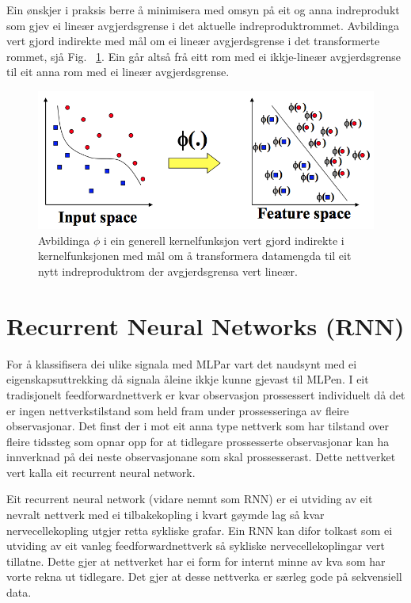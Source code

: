 \documentclass[oneside, nynorsk]{book}
\begin{document}
Ein ønskjer i praksis berre å minimisera med omsyn på eit og anna indreprodukt som gjev ei lineær avgjerdsgrense i det aktuelle indreproduktrommet. Avbildinga vert gjord indirekte med mål om ei lineær avgjerdsgrense i det transformerte rommet, sjå Fig. ~\ref{kerneltrick}.
Ein går altså frå eitt rom med ei ikkje-lineær avgjerdsgrense til eit anna rom med ei
lineær avgjerdsgrense.

\begin{figure}[h!]
    \centering
    \centerline{\includegraphics[width=1\linewidth]{kerneltrick}}
    \caption{Avbildinga $\phi$ i ein generell kernelfunksjon vert gjord indirekte i kernelfunksjonen med mål om å transformera datamengda til eit nytt indreproduktrom der avgjerdsgrensa vert lineær.}
    \label{kerneltrick}
\end{figure}
\newpage
\section{Recurrent Neural Networks (RNN)}
For å klassifisera dei ulike signala med MLPar vart det naudsynt med ei eigenskapsuttrekking då signala åleine ikkje
kunne gjevast til MLPen. I eit tradisjonelt feedforwardnettverk er kvar observasjon prossessert individuelt då det er ingen nettverkstilstand
som held fram under prossesseringa av fleire observasjonar. Det finst der i mot eit anna type nettverk som har tilstand over fleire tidssteg
som opnar opp for at tidlegare prossesserte observasjonar kan ha innverknad på dei neste observasjonane som skal prossesserast.
Dette nettverket vert kalla eit recurrent neural network.

Eit recurrent neural network (vidare nemnt som RNN) er ei utviding av eit nevralt nettverk med ei tilbakekopling i kvart gøymde lag så
kvar nervecellekopling utgjer retta sykliske grafar. Ein RNN kan difor tolkast som ei utviding av eit vanleg feedforwardnettverk så
sykliske nervecellekoplingar vert tillatne. Dette gjer at nettverket har ei form for internt minne av kva som har vorte rekna ut tidlegare.
Det gjer at desse nettverka er særleg gode på sekvensiell data.
\end{document}
